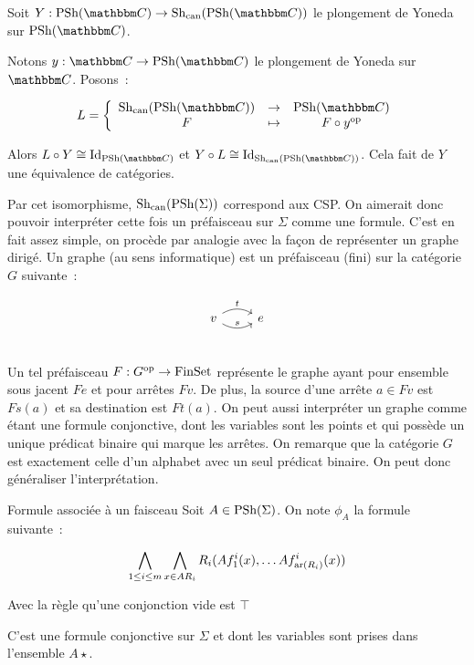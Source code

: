 \begin{prop}\label{canEq}
    Soit $Y : \psh(\C)\rightarrow\shc(\psh(\C))$ le plongement de Yoneda sur
    $\psh(\C)$.

    Notons $y : \C\rightarrow\psh(\C)$ le plongement de Yoneda sur $\C$. Posons~:

    \[L = \left\{\begin{array}{ccc}
             \shc(\psh(\C)) & \rightarrow & \psh(\C) \\
             F              & \mapsto     & F\circ y^\text{op} \\
    \end{array}\right.\]

    Alors $L\circ Y\cong\text{Id}_{\psh(\C)}$ et
    $Y\circ L\cong\text{Id}_{\shc(\psh(\C))}$. Cela fait de $Y$ une équivalence de
    catégories.
\end{prop}

\begin{pv}
\end{pv}

Par cet isomorphisme, $\text{Sh}_\text{can}(\text{PSh}(\Sigma))$ correspond aux CSP. On aimerait donc pouvoir
interpréter cette fois un préfaisceau sur $\Sigma$ comme une formule. C'est en fait assez
simple, on procède par analogie avec la façon de représenter un graphe dirigé. Un graphe
(au sens informatique) est un préfaisceau (fini) sur la catégorie $G$ suivante~:

\[\begin{tikzcd}
    v \arrow[r, bend right, "s"] \arrow[r, bend left, "t"] & e \\
\end{tikzcd}\]

Un tel préfaisceau $F : G^{\text{op}}\rightarrow\text{FinSet}$ représente le graphe ayant pour
ensemble sous jacent $Fe$ et pour arrêtes $Fv$. De plus, la source d'une arrête $a\in Fv$
est $Fs(a)$ et sa destination est $Ft(a)$. On peut aussi interpréter un graphe comme
étant une formule conjonctive, dont les variables sont les points et qui possède un
unique prédicat binaire qui marque les arrêtes. On remarque que la catégorie $G$ est
exactement celle d'un alphabet avec un seul prédicat binaire. On peut donc généraliser
l'interprétation.

\begin{defi}{Formule associée à un faisceau}
    Soit $A\in\text{PSh}(\Sigma)$. On note $\phi_A$ la formule suivante~:
    
    \[\bigwedge_{1\leq i\leq m} \bigwedge_{x\in AR_i}
            R_i(Af_1^i(x), \dots Af_{\text{ar}(R_i)}^i(x)) \]

    Avec la règle qu'une conjonction vide est $\top$

    C'est une formule conjonctive sur $\Sigma$ et dont les variables sont prises dans
    l'ensemble $A\star$.
\end{defi}

